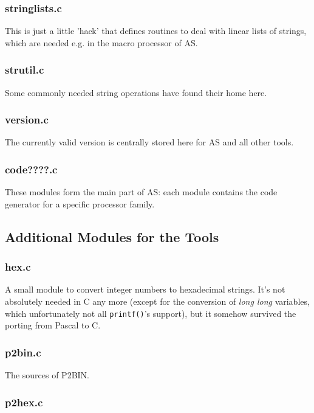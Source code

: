 \documentclass[12pt,twoside]{report}
\begin{document}
\subsubsection{stringlists.c}

This is just a little 'hack' that defines routines to deal with linear
lists of strings, which are needed e.g. in the macro processor of AS.

\subsubsection{strutil.c}

Some commonly needed string operations have found their home here.

\subsubsection{version.c}

The currently valid version is centrally stored here for AS and all other
tools.

\subsubsection{code????.c}

These modules form the main part of AS: each module contains the code
generator for a specific processor family.

\subsection{Additional Modules for the Tools}

\subsubsection{hex.c}

A small module to convert integer numbers to hexadecimal strings.  It's
not absolutely needed in C any more (except for the conversion of {\em
long long} variables, which unfortunately not all {\tt printf()}'s
support), but it somehow survived the porting from Pascal to C.

\subsubsection{p2bin.c}

The sources of P2BIN.

\subsubsection{p2hex.c}
\end{document}
